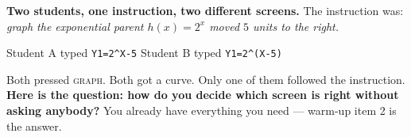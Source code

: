 \documentclass[10pt]{article}
\begin{document}
\vspace{0.10in}

\boxguard[12]
\begin{hookbox}
\small
\textbf{Two students, one instruction, two different screens.} The instruction was: \emph{graph the
exponential parent $h(x)=2^x$ moved $5$ units to the right.}

\smallskip
Student A typed \quad \texttt{Y1=2\^{}X-5} \qquad Student B typed \quad \texttt{Y1=2\^{}(X-5)}

\smallskip
Both pressed \textsc{graph}. Both got a curve. Only one of them followed the instruction.
\textbf{Here is the question: how do you decide which screen is right without asking anybody?} You
already have everything you need --- warm-up item 2 is the answer.

\\
\\
\end{hookbox}

\vspace{0.10in}
\end{document}
